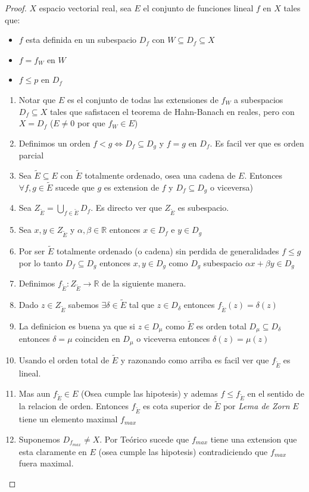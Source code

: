 \documentclass[10pt]{extarticle}
\theoremstyle{break}
\theoremstyle{definition}
\begin{document}
\begin{proof}
$X$ espacio vectorial real, sea $E$ el conjunto de funciones lineal $f$ en $X$ tales que:
\begin{itemize}
	\item $f$ esta definida en un subespacio $D_{f}$ con $W\subseteq D_{f}\subseteq X$
	\item $f=f_{W}$ en $W$
	\item $f\leq p$ en $D_{f}$
\end{itemize}
\begin{enumerate}
\item Notar que $E$ es el conjunto de todas las extensiones de $f_{W}$ a subespacios $D_{f}\subseteq X$ tales que safistacen el teorema de Hahn-Banach en reales, pero con $X=D_{f}$ ($E\neq 0$ por que $f_{W}\in E$)
\item Definimos un orden $f<g \iff D_{f}\subseteq D_{g}$ y $f=g$ en $D_{f}$. Es facil ver que es orden parcial
\item Sea $\tilde{E} \subseteq E$ con $\tilde{E}$ totalmente ordenado, osea una cadena de $E$. Entonces $\forall f,g\in \tilde{E}$ sucede que $g$ es extension de $f$ y $D_{f}\subseteq D_{g}$ o viceversa)
\item Sea $Z_{\tilde{E}}=\bigcup_{f\in \tilde{E}}D_{f}$. Es directo ver que $Z_{\tilde{E}}$ es subespacio.
\item Sea $x,y\in Z_{\tilde{E}}$ y $\alpha ,\beta\in \mathbb{R}$ entonces $x\in D_{f}$ e $y\in D_{g}$
\item Por ser $\tilde{E}$ totalmente ordenado (o cadena) sin perdida de generalidades $f\leq g$ por lo tanto $D_{f}\subseteq D_{g}$ entonces $x,y\in D_{g}$ como $D_{g}$ subespacio $\alpha x+\beta y\in D_{g}$
\item Definimos $f_{\tilde{E}}:Z_{\tilde{E}}\rightarrow\mathbb{R}$ de la siguiente manera.
\item Dado $z\in Z_{\tilde{E}}$ sabemos $\exists \delta \in \tilde{E}$ tal que $z\in D_{\delta}$ entonces $f_{\tilde{E}}(z)=\delta(z)$
\item La definicion es buena ya que si $z\in D_{\mu}$ como $\tilde{E}$ es orden total $D_{\mu}\subseteq D_{\delta}$ entonces $\delta = \mu$ coinciden en $D_{\mu}$ o viceversa entonces $\delta(z)=\mu(z)$
\item Usando el orden total de $\tilde{E}$ y razonando como arriba es facil ver que $f_{\tilde{E}}$ es lineal.
\item Mas aun $f_{\tilde{E}}\in E$ (Osea cumple las hipotesis) y ademas $f\leq f_{\tilde{E}}$ en el sentido de la relacion de orden. Entonces $f_{\tilde{E}}$ es cota superior de $\tilde{E}$ por \emph{Lema de Zorn} $E$ tiene un elemento maximal $f_{max}$
\item Suponemos $D_{f_{max}}\neq X$. Por Teórico sucede que $f_{max}$ tiene una extension que esta claramente en $E$ (osea cumple las hipotesis) contradiciendo que $f_{max}$ fuera maximal.
\end{enumerate}
\end{proof}
\end{document}
